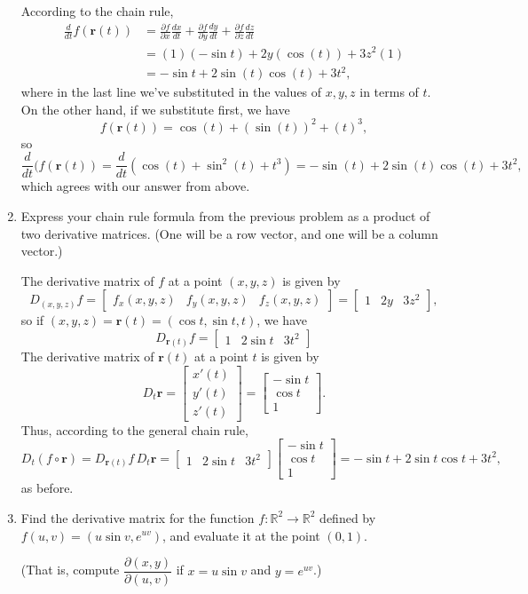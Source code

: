 \documentclass[letterpaper,12pt]{article}
\newcommand{\R}{\mathbb{R}}
\renewcommand{\r}{\mathbf{r}}
\newcommand{\bbm}{\begin{bmatrix}}
\newcommand{\ebm}{\end{bmatrix}}
\begin{document}
\begin{enumerate}
\bigskip

According to the chain rule, 
\begin{align*}
 \frac{d}{dt}f(\mathbf{r}(t)) &= \frac{\partial f}{\partial x}\frac{dx}{dt}+\frac{\partial f}{\partial y}\frac{dy}{dt}+\frac{\partial f}{\partial z}\frac{dz}{dt}\\
& = (1)(-\sin t)+2y(\cos(t))+3z^2(1)\\
& = -\sin t + 2\sin(t)\cos(t) + 3t^2,
\end{align*}
where in the last line we've substituted in the values of $x,y,z$ in terms of $t$. On the other hand, if we substitute first, we have
\[
 f(\mathbf{r}(t)) = \cos(t)+(\sin(t))^2+(t)^3,
\]
so
\[
 \frac{d}{dt}(f(\mathbf{r}(t)) = \frac{d}{dt}(\cos (t) + \sin^2(t) + t^3) = -\sin (t) +2\sin(t)\cos(t) + 3t^2,
\]
which agrees with our answer from above.

 \item Express your chain rule formula from the previous problem as a product of two derivative matrices. (One will be a row vector, and one will be a column vector.)

\bigskip

The derivative matrix of $f$ at a point $(x,y,z)$ is given by
\[
 D_{(x,y,z)}f = \bbm f_x(x,y,z) & f_y(x,y,z) & f_z(x,y,z)\ebm = \bbm 1 & 2y & 3z^2\ebm,
\]
so if $(x,y,z) = \mathbf{r}(t) = (\cos t, \sin t, t)$, we have
\[
 D_{\mathbf{r}(t)}f = \bbm 1 & 2\sin t & 3t^2\ebm
\]
The derivative matrix of $\r(t)$ at a point $t$ is given by
\[
 D_t\r = \bbm x'(t)\\y'(t)\\z'(t)\ebm = \bbm -\sin t\\ \cos t\\1\ebm.
\]
Thus, according to the general chain rule,
\[
 D_t(f\circ \r) = D_{\r(t)}f\, D_t\r = \bbm 1 & 2\sin t & 3t^2\ebm \bbm -\sin t\\ \cos t\\ 1\ebm = -\sin t + 2\sin t\cos t +3t^2,
\]
as before.

\bigskip

 \item Find the derivative matrix for the function $f:\R^2\to \R^2$ defined by $f(u,v) = (u\sin v, e^{uv})$, and evaluate it at the point $(0,1)$.

(That is, compute $\dfrac{\partial(x,y)}{\partial (u,v)}$ if $x=u\sin v$ and $y=e^{uv}$.)

 \bigskip


\end{enumerate}
\end{document}

